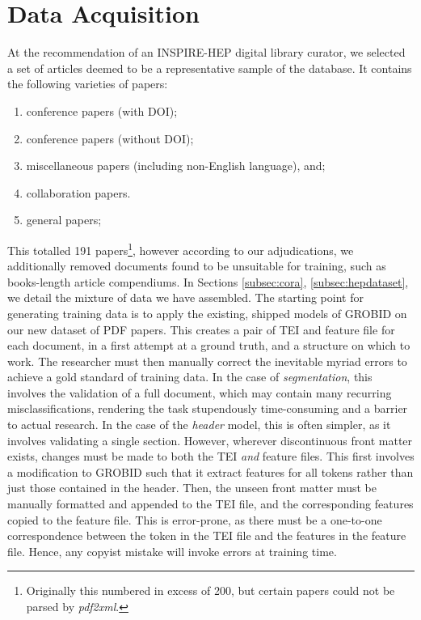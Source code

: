 \section{Data Acquisition}
\label{sec:data}

At the recommendation of an INSPIRE-HEP digital library curator, we selected a set of articles deemed to be a representative sample of the database. It contains the following varieties of papers:

\begin{enumerate}
\item conference papers (with DOI);
\item conference papers (without DOI);
\item miscellaneous papers (including non-English language), and;
\item collaboration papers.
\item general papers;
\end{enumerate}

This totalled 191 papers\footnote{Originally this numbered in excess of 200, but certain papers could not be parsed by \emph{pdf2xml}.}, however according to our adjudications, we additionally removed documents found to be unsuitable for training, such as books-length article compendiums. In Sections \ref{subsec:cora}, \ref{subsec:hepdataset}, we detail the mixture of data we have assembled. The starting point for generating training data is to apply the existing, shipped models of GROBID on our new dataset of PDF papers. This creates a pair of TEI and feature file for each document, in a first attempt at a ground truth, and a structure on which to work. The researcher must then manually correct the inevitable myriad errors to achieve a gold standard of training data. In the case of \emph{segmentation}, this involves the validation of a full document, which may contain many recurring misclassifications, rendering the task stupendously time-consuming and a barrier to actual research. In the case of the \emph{header} model, this is often simpler, as it involves validating a single section. However, wherever discontinuous front matter exists, changes must be made to both the TEI \emph{and} feature files. This first involves a modification to GROBID such that it extract features for all tokens rather than just those contained in the header. Then, the unseen front matter must be manually formatted and appended to the TEI file, and the corresponding features copied to the feature file. This is error-prone, as there must be a one-to-one correspondence between the token in the TEI file and the features in the feature file. Hence, any copyist mistake will invoke errors at training time.

